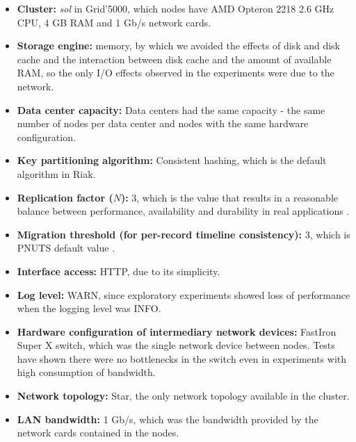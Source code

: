 \documentclass[man,floatsintext,12pt]{apa6}
\begin{document}
\begin{itemize}

\item \textbf{Cluster:} \textit{sol} in Grid'5000, which nodes have AMD Opteron
2218 2.6 GHz CPU, 4 GB RAM and 1 Gb/s network cards.

\item \textbf{Storage engine:} memory, by which we avoided the effects of disk
and disk cache and the interaction between disk cache and the amount of
available RAM, so the only I/O effects observed in the experiments were due to
the network.

\item \textbf{Data center capacity:} Data centers had the same capacity - the
same number of nodes per data center and nodes with the same hardware
configuration.

\item \textbf{Key partitioning algorithm:} Consistent hashing, which is the
default algorithm in Riak.

\item \textbf{Replication factor ($ N $):} 3, which is the value that results
in a reasonable balance between performance, availability and durability in
real applications \parencite{DeCandia2007}.

\item \textbf{Migration threshold (for per-record timeline consistency):} 3,
which is PNUTS default value \parencite{Cooper2008}.

\item \textbf{Interface access:} HTTP, due to its simplicity.

\item \textbf{Log level:} WARN, since exploratory experiments showed loss of
performance when the logging level was INFO.

\item \textbf{Hardware configuration of intermediary network devices:} FastIron
Super X switch, which was the single network device between nodes. Tests have
shown there were no bottlenecks in the switch even in experiments with high
consumption of bandwidth.

\item \textbf{Network topology:} Star, the only network topology available in
the cluster.

\item \textbf{LAN bandwidth:} 1 Gb/s, which was the bandwidth provided by the
network cards contained in the nodes.


\end{itemize}
\end{document}
